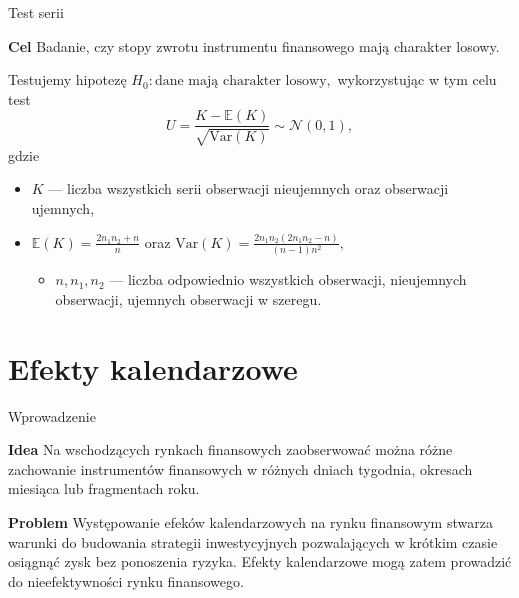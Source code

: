 \documentclass[a4paper, 11pt]{beamer}
\begin{document}
	\begin{frame}{Test serii}
		\begin{block}{\textbf{Cel}}
			Badanie, czy stopy zwrotu instrumentu finansowego mają charakter
			losowy.
		\end{block}
		Testujemy hipotezę $H_{0}: \mbox{dane mają charakter losowy},$ 
		wykorzystując w tym celu test \[
			U=\frac{K-\mathbb{E}\left(K\right)}{\sqrt{\mbox{Var}\left(K\right)}} \sim \mathcal{N}\left(0,1\right),
		\] gdzie
		\begin{itemize}
			\item $K$ --- liczba wszystkich serii obserwacji nieujemnych oraz obserwacji ujemnych,
			\item $\mathbb{E}\left(K\right) = \frac{2 n_1 n_2 + n}{n}$ oraz
				$\mbox{Var}\left(K\right) = \frac{2 n_1 n_2 \left(2 n_1 n_2 - n\right)}{\left(n - 1\right) n^2},$
			\begin{itemize}
				\item $n, n_1, n_2$ --- liczba odpowiednio wszystkich obserwacji, nieujemnych obserwacji, ujemnych obserwacji w szeregu.
			\end{itemize}
		\end{itemize}
	\end{frame}
	
	\section{Efekty kalendarzowe}
	
	\begin{frame}{Wprowadzenie}
		\begin{block}{\textbf{Idea}}
			Na wschodzących rynkach finansowych zaobserwować można różne 
			zachowanie instrumentów finansowych w różnych dniach tygodnia, okresach
			miesiąca lub fragmentach roku.
		\end{block}
		\begin{block}{\textbf{Problem}}
			Występowanie efeków kalendarzowych na rynku finansowym stwarza warunki 
			do budowania strategii inwestycyjnych pozwalających w krótkim czasie 
			osiągnąć zysk bez ponoszenia ryzyka. Efekty kalendarzowe mogą zatem
			prowadzić do nieefektywności rynku finansowego.
		\end{block}
	\end{frame}
	
\end{document}
